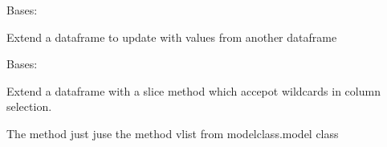 \documentclass[letterpaper,10pt,english]{sphinxmanual}
\begin{document}

\begin{fulllineitems}
\label{\detokenize{used/modelmf:modelmf.mfupdate}}
\pysigstartsignatures
{}
\pysigstopsignatures
\sphinxAtStartPar
Bases: 

\sphinxAtStartPar
Extend a dataframe to update with values from another dataframe

\begin{fulllineitems}
\label{\detokenize{used/modelmf:modelmf.mfupdate.second}}
\pysigstartsignatures
{}
\pysigstopsignatures
\end{fulllineitems}


\end{fulllineitems}


\begin{fulllineitems}
\label{\detokenize{used/modelmf:modelmf.ibloc}}
\pysigstartsignatures
{}
\pysigstopsignatures
\sphinxAtStartPar
Bases: 

\sphinxAtStartPar
Extend a dataframe with a slice method which accepot wildcards in column selection.

\sphinxAtStartPar
The method just juse the method vlist from modelclass.model class

\end{fulllineitems}


\begin{fulllineitems}
\label{\detokenize{used/modelmf:modelmf.f}}
\pysigstartsignatures
{}
\pysigstopsignatures
\end{fulllineitems}
\end{document}
